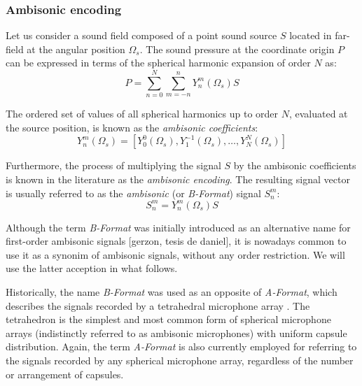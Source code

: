 \subsubsection{Ambisonic encoding}

Let us consider a sound field composed of a point sound source $S$ located in far-field at the angular position $\Omega_s$. The sound pressure at the coordinate origin $P$ can be expressed in terms of the spherical harmonic expansion of order $N$ as: 
\begin{equation}
	P = \sum_{n=0}^{N} \sum_{m=-n}^{n} Y_n^m(\Omega_s) S
	\label{eq:encoding}
\end{equation}


The ordered set of values of all spherical harmonics up to order $N$, evaluated at the source position, is known as the \textit{ambisonic coefficients}:
\begin{equation}
	Y_n^m(\Omega_s) = [Y_0^0(\Omega_s), Y_1^{-1}(\Omega_s),  \ldots ,  Y_N^N(\Omega_s)]
	\label{eq:sphericalharmonicvector}
\end{equation}

Furthermore, the process of multiplying the signal $S$ by the ambisonic coefficients is known in the literature as the \textit{ambisonic encoding}. The resulting signal vector is usually referred to as the \textit{ambisonic} (or \textit{B-Format}) signal $S_n^m$:
\begin{equation}
	S_n^m = Y_n^m(\Omega_s) S
\end{equation}


Although the term \textit{B-Format} was initially introduced as an alternative name for first-order ambisonic signals [gerzon, tesis de daniel], it is nowadays common to use it as a synonim of ambisonic signals, without any order restriction. We will use the latter acception in what follows.

Historically, the name \textit{B-Format} was used as an opposite of \textit{A-Format}, which describes the signals recorded by a tetrahedral microphone array \cite{gerzon1975design}. The tetrahedron is the simplest and most common form of spherical microphone arrays (indistinctly referred to as ambisonic microphones) with uniform capsule distribution. Again, the term \textit{A-Format} is also currently employed for referring to the signals recorded by any spherical microphone array, regardless of the number or arrangement of capsules.

